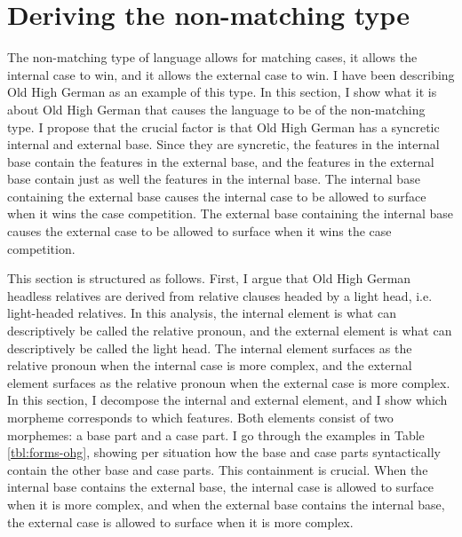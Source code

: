 \section{Deriving the non-matching type}\label{sec:deriving-nonmatching}

The non-matching type of language allows for matching cases, it allows the internal case to win, and it allows the external case to win. I have been describing Old High German as an example of this type. In this section, I show what it is about Old High German that causes the language to be of the non-matching type. I propose that the crucial factor is that Old High German has a syncretic internal and external base. Since they are syncretic, the features in the internal base contain the features in the external base, and the features in the external base contain just as well the features in the internal base. The internal base containing the external base causes the internal case to be allowed to surface when it wins the case competition. The external base containing the internal base causes the external case to be allowed to surface when it wins the case competition.

This section is structured as follows. First, I argue that Old High German headless relatives are derived from relative clauses headed by a light head, i.e. light-headed relatives. In this analysis, the internal element is what can descriptively be called the relative pronoun, and the external element is what can descriptively be called the light head. The internal element surfaces as the relative pronoun when the internal case is more complex, and the external element surfaces as the relative pronoun when the external case is more complex. In this section, I decompose the internal and external element, and I show which morpheme corresponds to which features. Both elements consist of two morphemes: a base part and a case part. I go through the examples in Table \ref{tbl:forms-ohg}, showing per situation how the base and case parts syntactically contain the other base and case parts. This containment is crucial. When the internal base contains the external base, the internal case is allowed to surface when it is more complex, and when the external base contains the internal base, the external case is allowed to surface when it is more complex.

